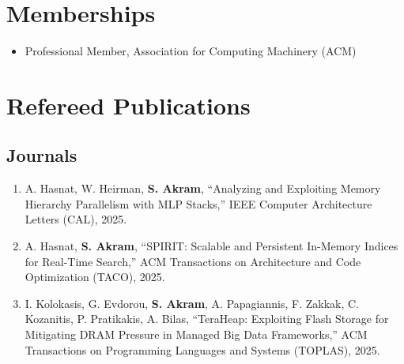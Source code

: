 \documentclass[singlecolumn,singlespace,11pt]{article}
\begin{document}
\section*{Memberships}

\begin{itemize}
\item Professional Member, Association for Computing Machinery (ACM)
\end{itemize}

\section*{Refereed Publications}
\subsection*{Journals}
\begin{enumerate}
\item
A. Hasnat, W. Heirman, \textbf{S. Akram}, ``Analyzing and Exploiting Memory Hierarchy Parallelism with MLP Stacks,'' IEEE Computer Architecture Letters (CAL), 2025.
\item
A. Hasnat, \textbf{S. Akram}, ``SPIRIT: Scalable and Persistent In-Memory Indices for Real-Time Search,'' ACM Transactions on Architecture and Code Optimization (TACO), 2025.
\item 
I. Kolokasis, G. Evdorou, \textbf{S. Akram}, A. Papagiannis, F. Zakkak, C. Kozanitis, P. Pratikakis, A. Bilas, ``TeraHeap: Exploiting Flash Storage for Mitigating DRAM Pressure in Managed Big Data Frameworks,'' ACM Transactions on Programming Languages and Systems (TOPLAS), 2025. 


\end{enumerate}
\end{document}
